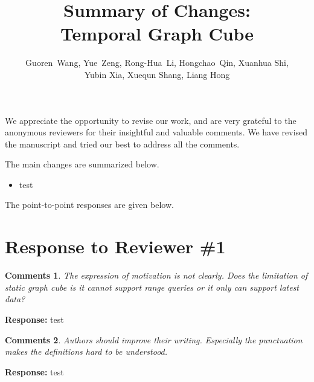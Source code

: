 \documentclass{article}
\title{Summary of Changes: \\Temporal Graph Cube}
\author{Guoren~Wang,
	Yue~Zeng,
	Rong-Hua~Li,
	Hongchao~Qin,
	Xuanhua Shi,\\
	Yubin Xia, 
	Xuequn Shang, 
	Liang Hong
}
\date{}
\newtheorem{Comments}{\textbf{Comments}}
\begin{document}
\maketitle

We appreciate the opportunity to revise our work, and are very grateful to the anonymous reviewers for their insightful and valuable comments. We have revised the manuscript and tried our best to address all the comments. 

The main changes are summarized below.
\begin{itemize}

\item test

\end{itemize}

The point-to-point responses are given below.
	
\section{Response to Reviewer \#1}
\begin{Comments}
The expression of motivation is not clearly. Does the limitation of static graph cube is it cannot support range queries or it only can support latest data?
\end{Comments}
\noindent \textbf{Response:} test

\begin{Comments}
Authors should improve their writing. Especially the punctuation makes the definitions hard to be understood.
\end{Comments}
\noindent \textbf{Response:} test
\end{document}
